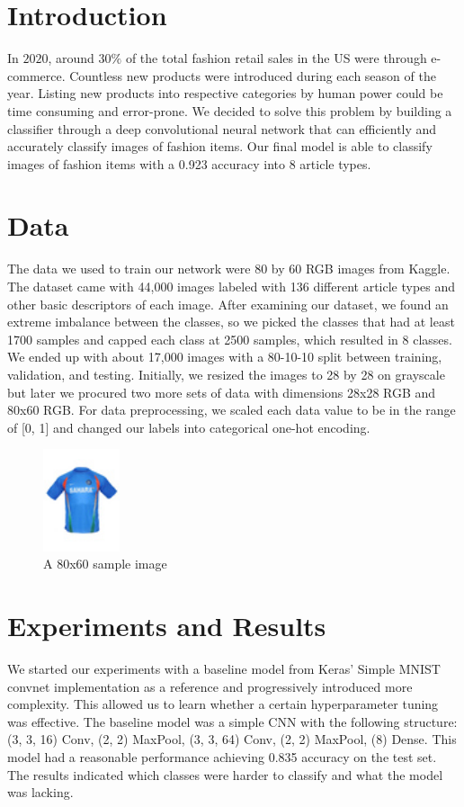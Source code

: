 \documentclass[twoside,twocolumn,9pt]{article}
\begin{document}
\section{Introduction}
In $2020$, around $30\%$ of the total fashion retail sales in the US were through e-commerce. Countless new products were introduced during each season of the year. Listing new products into respective categories by human power could be time consuming and error-prone. We decided to solve this problem by building a classifier through a deep convolutional neural network that can efficiently and accurately classify images of fashion items. Our final model is able to classify images of fashion items with a 0.923 accuracy into 8 article types. 

\section{Data}

The data we used to train our network were 80 by 60 RGB images from Kaggle\cite{Kaggle}. The dataset came with 44,000 images labeled with 136 different article types and other basic descriptors of each image. After examining our dataset, we found an extreme imbalance between the classes, so we picked the classes that had at least 1700 samples and capped each class at 2500 samples, which resulted in 8 classes. We ended up with about 17,000 images with a 80-10-10 split between training, validation, and testing. Initially, we resized the images to 28 by 28 on grayscale but later we procured two more sets of data with dimensions 28x28 RGB and 80x60 RGB. For data preprocessing, we scaled each data value to be in the range of [0, 1] and changed our labels into categorical one-hot encoding. 

\begin{figure}[h]
\centering
  \includegraphics[height=3cm]{images/1163}
  \caption{A 80x60 sample image}
  \label{fgr:example}
\end{figure}

\section{Experiments and Results}
We started our experiments with a baseline model from Keras' Simple MNIST convnet \cite{Keras} implementation as a reference and progressively introduced more complexity. This allowed us to learn whether a certain hyperparameter tuning was effective. The baseline model was a simple CNN with the following structure: (3, 3, 16) Conv, (2, 2) MaxPool, (3, 3, 64) Conv, (2, 2) MaxPool, (8) Dense. This model had a reasonable performance achieving 0.835 accuracy on the test set. The results indicated which classes were harder to classify and what the model was lacking.
\end{document}

